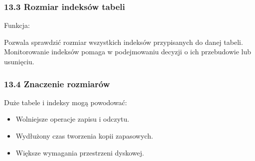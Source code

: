 \documentclass[a4paper,11pt,openany,english]{sphinxmanual}
\begin{document}
\begin{sphinxVerbatim}[commandchars=\\\{\}]
    
    
 
   
\end{sphinxVerbatim}


\subsubsection{13.3 Rozmiar indeksów tabeli}
\label{\detokenize{rozdzial2/Konfiguracja_baz_danych/Konfiguracja_baz_danych:rozmiar-indeksow-tabeli}}
\sphinxAtStartPar
Funkcja:

\begin{sphinxVerbatim}[commandchars=\\\{\}]
\end{sphinxVerbatim}

\sphinxAtStartPar
Pozwala sprawdzić rozmiar wszystkich indeksów przypisanych do danej tabeli. Monitorowanie indeksów pomaga w podejmowaniu decyzji o ich przebudowie lub usunięciu.


\subsubsection{13.4 Znaczenie rozmiarów}
\label{\detokenize{rozdzial2/Konfiguracja_baz_danych/Konfiguracja_baz_danych:znaczenie-rozmiarow}}
\sphinxAtStartPar
Duże tabele i indeksy mogą powodować:
\begin{itemize}
\item {} 
\sphinxAtStartPar
Wolniejsze operacje zapisu i odczytu.

\item {} 
\sphinxAtStartPar
Wydłużony czas tworzenia kopii zapasowych.

\item {} 
\sphinxAtStartPar
Większe wymagania przestrzeni dyskowej.

\end{itemize}
\end{document}
